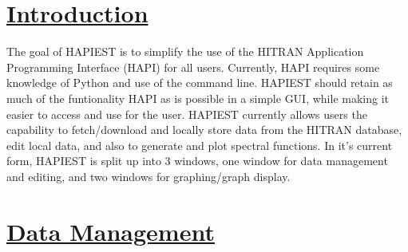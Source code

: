\documentclass[a0,landscape]{a0poster}
\begin{document}
\begin{multicols}{3} %


\color{Black}
\section*{\underline{Introduction}}
The goal of HAPIEST is to simplify the use of the HITRAN Application Programming Interface (HAPI) for all users. Currently, HAPI requires some knowledge of Python and use of the command line. HAPIEST should retain as much of the funtionality HAPI as is possible in a simple GUI, while making it easier to access and use for the user. HAPIEST currently allows users the capability to fetch/download and locally store data from the HITRAN database, edit local data, and also to generate and plot spectral functions. In it's current form, HAPIEST is split up into 3 windows, one window for data management and editing, and two windows for graphing/graph display.


\section*{\underline{Data Management}}


\end{multicols}
\end{document}
